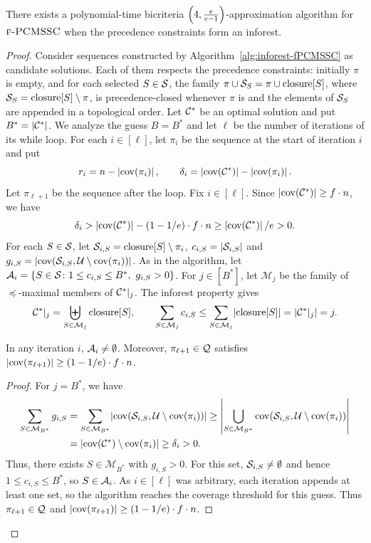 
\begin{theorem}\label{thm:inforest-PCMSSC}
    \setlength{\emergencystretch}{2em}
    There exists a polynomial-time bicriteria $\mathopen{}\left( 4,\frac{e}{e-1} \right)$-approximation algorithm for $\textup{\textsc{f-PCMSSC}}$ when the precedence constraints form an inforest.
\end{theorem}
\begin{proof}
Consider sequences constructed by Algorithm~\ref{alg:inforest-fPCMSSC} as candidate solutions. Each of them respects the precedence constraints: initially $\pi$ is empty, and for each selected $S\in\mathcal{S}$, the family $\pi\cup \mathcal{S}_S=\pi\cup\operatorname{closure}[S]$, where $\mathcal{S}_S=\operatorname{closure}[S]\setminus\pi$, is precedence-closed whenever $\pi$ is and the elements of $\mathcal{S}_S$ are appended in a topological order.
Let $\mathcal{C}^{*}$ be an optimal solution and put $B^*=\mathopen{}\left| \mathcal{C}^{*} \right|$. We analyze the guess $B=B^*$ and let $\ell$ be the number of iterations of its while loop. For each $i\in[\ell]$, let $\pi_i$ be the sequence at the start of iteration $i$ and put
\[
    r_i=n-\mathopen{}\left| \operatorname{cov}\mathopen{}\left( \pi_i \right) \right|,\qquad
    \delta_i=\mathopen{}\left| \operatorname{cov}\mathopen{}\left( \mathcal{C}^{*} \right) \right|-\mathopen{}\left| \operatorname{cov}\mathopen{}\left( \pi_i \right) \right|.
\]
Let $\pi_{\ell+1}$ be the sequence after the loop. Fix $i\in[\ell]$. Since $\mathopen{}\left| \operatorname{cov}\mathopen{}\left( \mathcal{C}^{*} \right) \right|\geq f\cdot n$, we have
\[
    \delta_i>\mathopen{}\left| \operatorname{cov}\mathopen{}\left( \mathcal{C}^{*} \right) \right|-\mathopen{}\left( 1-1/e \right)\cdot f\cdot n\geq\mathopen{}\left| \operatorname{cov}\mathopen{}\left( \mathcal{C}^{*} \right) \right|/e>0.
\]
For each $S\in\mathcal{S}$, let $\mathcal{S}_{i,S}=\operatorname{closure}[S]\setminus\pi_i$, $c_{i,S}=\mathopen{}\left| \mathcal{S}_{i,S} \right|$ and $g_{i,S}=\mathopen{}\left| \operatorname{cov}\mathopen{}\left( \mathcal{S}_{i,S},\mathcal{U}\setminus\operatorname{cov}\mathopen{}\left( \pi_i \right) \right) \right|$. As in the algorithm, let $\cA_i=\brc{S\in\cS\colon 1\leq c_{i,S}\leq B^*,\ g_{i,S}>0}$. For $j\in[B^*]$, let $\mathcal{M}_j$ be the family of $\preceq$-maximal members of $\mathcal{C}^{*}|_{j}$. The inforest property gives
\[
    \mathcal{C}^{*}|_{j}=\biguplus_{S\in\mathcal{M}_j}\operatorname{closure}[S],\qquad
    \sum_{S\in\mathcal{M}_j}c_{i,S}
    \leq\sum_{S\in\mathcal{M}_j}\mathopen{}\left| \operatorname{closure}[S] \right|
    =\mathopen{}\left| \mathcal{C}^{*}|_{j} \right|=j.
\]
\begin{claim}\label{claim:inforest-pcmssc-coverage}
In any iteration $i$, $\mathcal{A}_i\neq\emptyset$. Moreover, $\pi_{\ell+1}\in\mathcal{Q}$ satisfies $\mathopen{}\left| \operatorname{cov}\mathopen{}\left( \pi_{\ell+1} \right) \right|\geq(1-1/e)\cdot f\cdot n$.
\end{claim}
\begin{proof}
For $j=B^*$, we have
\begin{align*}
    \sum_{S\in\mathcal{M}_{B^*}}g_{i,S}
    &=\sum_{S\in\mathcal{M}_{B^*}}\mathopen{}\left| \operatorname{cov}\mathopen{}\left( \mathcal{S}_{i,S},\mathcal{U}\setminus\operatorname{cov}\mathopen{}\left( \pi_i \right) \right) \right|
    \geq\mathopen{}\left| \bigcup_{S\in\mathcal{M}_{B^*}}\operatorname{cov}\mathopen{}\left( \mathcal{S}_{i,S},\mathcal{U}\setminus\operatorname{cov}\mathopen{}\left( \pi_i \right) \right) \right|\\
    &=\mathopen{}\left| \operatorname{cov}\mathopen{}\left( \mathcal{C}^{*} \right)\setminus\operatorname{cov}\mathopen{}\left( \pi_i \right) \right|\geq\delta_i>0.
\end{align*}
Thus, there exists $S\in\mathcal{M}_{B^*}$ with $g_{i,S}>0$. For this set, $\mathcal{S}_{i,S}\neq\emptyset$ and hence $1\leq c_{i,S}\leq B^*$, so $S\in\mathcal{A}_i$. As $i\in[\ell]$ was arbitrary, each iteration appends at least one set, so the algorithm reaches the coverage threshold for this guess. Thus $\pi_{\ell+1}\in\mathcal{Q}$ and $\mathopen{}\left| \operatorname{cov}\mathopen{}\left( \pi_{\ell+1} \right) \right|\geq(1-1/e)\cdot f\cdot n$.
\end{proof}


\end{proof}

